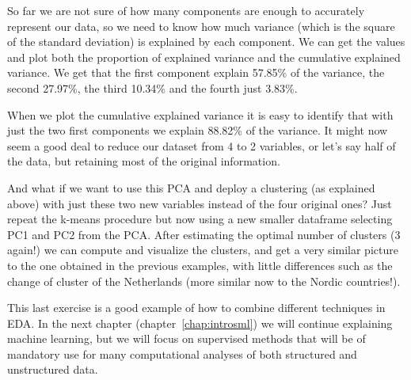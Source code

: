 
So far we are not sure of how many components are enough to accurately represent our data, so we need to know how much variance (which is the square of the standard deviation) is explained by each component. We can get the values and plot both the proportion of explained variance and the cumulative explained variance. We get that the first component explain 57.85\% of the variance, the second 27.97\%, the third 10.34\% and the fourth just 3.83\%. 


When we plot the cumulative explained variance it is easy to identify that with just the two first components we explain 88.82\% of the variance. It might now seem a good deal to reduce our dataset from 4 to 2 variables, or let’s say half of the data, but retaining most of the original information.


And what if we want to use this PCA and deploy a clustering (as explained above) with just these two new variables instead of the four original ones?  Just repeat the k-means procedure but now using a new smaller dataframe selecting PC1 and PC2 from the PCA. After estimating the optimal number of clusters (3 again!) we can compute and visualize the clusters, and get a very similar picture to the one obtained in the previous examples, with little differences such as the change of cluster of the Netherlands (more similar now to the Nordic countries!). 


This last exercise is a good example of how to combine different techniques in EDA. In the next chapter (chapter~\ref{chap:introsml}) we will continue explaining machine learning, but we will focus on supervised methods that will be of mandatory use for many computational analyses of both structured and unstructured data.
